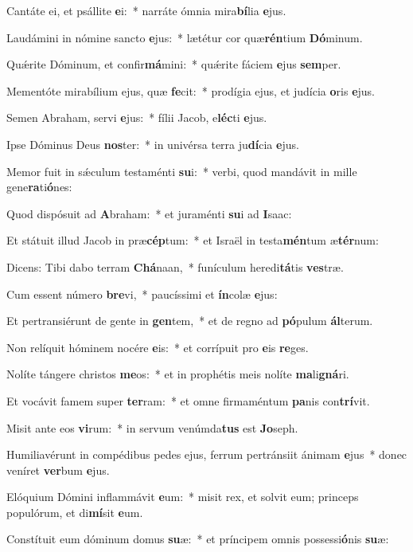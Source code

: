 \item Cantáte ei, et psállite \textbf{e}i:~* narráte ómnia mira\textbf{bí}lia \textbf{e}jus.
\item Laudámini in nómine sancto \textbf{e}jus:~* lætétur cor quæ\textbf{rén}tium \textbf{Dó}minum.
\item Quǽrite Dóminum, et confir\textbf{má}mini:~* quǽrite fáciem \textbf{e}jus \textbf{sem}per.
\item Mementóte mirabílium ejus, quæ \textbf{fe}cit:~* prodígia ejus, et judícia \textbf{o}ris \textbf{e}jus.
\item Semen Abraham, servi \textbf{e}jus:~* fílii Jacob, e\textbf{léc}ti \textbf{e}jus.
\item Ipse Dóminus Deus \textbf{nos}ter:~* in univérsa terra ju\textbf{dí}cia \textbf{e}jus.
\item Memor fuit in sǽculum testaménti \textbf{su}i:~* verbi, quod mandávit in mille gene\textbf{ra}ti\textbf{ó}nes:
\item Quod dispósuit ad \textbf{A}braham:~* et juraménti \textbf{su}i ad \textbf{I}saac:
\item Et státuit illud Jacob in præ\textbf{cép}tum:~* et Israël in testa\textbf{mén}tum æ\textbf{tér}num:
\item Dicens: Tibi dabo terram \textbf{Chá}naan,~* funículum heredi\textbf{tá}tis \textbf{ves}træ.
\item Cum essent número \textbf{bre}vi,~* paucíssimi et \textbf{ín}colæ \textbf{e}jus:
\item Et pertransiérunt de gente in \textbf{gen}tem,~* et de regno ad \textbf{pó}pulum \textbf{ál}terum.
\item Non relíquit hóminem nocére \textbf{e}is:~* et corrípuit pro \textbf{e}is \textbf{re}ges.
\item Nolíte tángere christos \textbf{me}os:~* et in prophétis meis nolíte \textbf{ma}li\textbf{gná}ri.
\item Et vocávit famem super \textbf{ter}ram:~* et omne firmaméntum \textbf{pa}nis con\textbf{trí}vit.
\item Misit ante eos \textbf{vi}rum:~* in servum venúmda\textbf{tus} est \textbf{Jo}seph.
\item Humiliavérunt in compédibus pedes ejus, ferrum pertránsiit ánimam \textbf{e}jus~* donec veníret \textbf{ver}bum \textbf{e}jus.
\item Elóquium Dómini inflammávit \textbf{e}um:~* misit rex, et solvit eum; princeps populórum, et di\textbf{mí}sit \textbf{e}um.
\item Constítuit eum dóminum domus \textbf{su}æ:~* et príncipem omnis possessi\textbf{ó}nis \textbf{su}æ:
